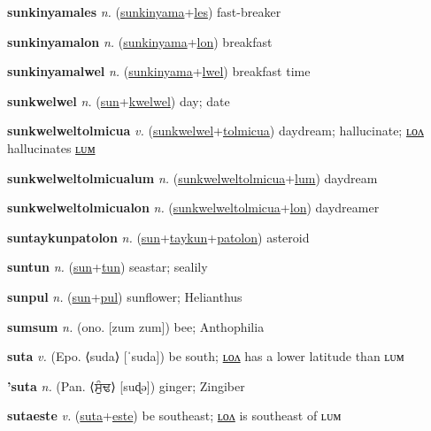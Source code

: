\textbf{\hypertarget{sunkinyamales}{sunkinyamales}} \textit{n.} (\hyperlink{sunkinyama}{sunkinyama}+\allowbreak \hyperlink{les}{les})
fast-breaker

\textbf{\hypertarget{sunkinyamalon}{sunkinyamalon}} \textit{n.} (\hyperlink{sunkinyama}{sunkinyama}+\allowbreak \hyperlink{lon}{lon})
breakfast

\textbf{\hypertarget{sunkinyamalwel}{sunkinyamalwel}} \textit{n.} (\hyperlink{sunkinyama}{sunkinyama}+\allowbreak \hyperlink{lwel}{lwel})
breakfast time

\textbf{\hypertarget{sunkwelwel}{sunkwelwel}} \textit{n.} (\hyperlink{sun}{sun}+\allowbreak \hyperlink{kwelwel}{kwelwel})
day; date

\textbf{\hypertarget{sunkwelweltolmicua}{sunkwelweltolmicua}} \textit{v.} (\hyperlink{sunkwelwel}{sunkwelwel}+\allowbreak \hyperlink{tolmicua}{tolmicua})
daydream; hallucinate; \hyperlink{sunkwelweltolmicualon}{ʟᴏᴧ} hallucinates \hyperlink{sunkwelweltolmicualum}{ʟᴜᴍ}

\textbf{\hypertarget{sunkwelweltolmicualum}{sunkwelweltolmicualum}} \textit{n.} (\hyperlink{sunkwelweltolmicua}{sunkwelweltolmicua}+\allowbreak \hyperlink{lum}{lum})
daydream

\textbf{\hypertarget{sunkwelweltolmicualon}{sunkwelweltolmicualon}} \textit{n.} (\hyperlink{sunkwelweltolmicua}{sunkwelweltolmicua}+\allowbreak \hyperlink{lon}{lon})
daydreamer

\textbf{\hypertarget{suntaykunpatolon}{suntaykunpatolon}} \textit{n.} (\hyperlink{sun}{sun}+\allowbreak \hyperlink{taykun}{taykun}+\allowbreak \hyperlink{patolon}{patolon})
asteroid

\textbf{\hypertarget{suntun}{suntun}} \textit{n.} (\hyperlink{sun}{sun}+\allowbreak \hyperlink{tun}{tun})
seastar; sealily

\textbf{\hypertarget{sunpul}{sunpul}} \textit{n.} (\hyperlink{sun}{sun}+\allowbreak \hyperlink{pul}{pul})
sunflower; Helianthus

\textbf{\hypertarget{sumsum}{sumsum}} \textit{n.} (ono. [zum zum])
bee; Anthophilia

\textbf{\hypertarget{suta}{suta}} \textit{v.} (Epo. ⟨suda⟩ [ˈsuda])
be south; \hyperlink{sutalon}{ʟᴏᴧ} has a lower latitude than ʟᴜᴍ

\textbf{\hypertarget{'suta}{'suta}} \textit{n.} (Pan. ⟨{\gurmukhi{}ਸੁੰਢ}⟩ [suɖə])
ginger; Zingiber

\textbf{\hypertarget{sutaeste}{sutaeste}} \textit{v.} (\hyperlink{suta}{suta}+\allowbreak \hyperlink{este}{este})
be southeast; \hyperlink{sutaestelon}{ʟᴏᴧ} is southeast of ʟᴜᴍ

